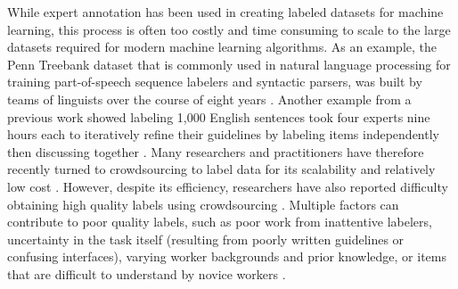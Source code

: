 While expert annotation has been used in creating labeled datasets for machine learning, this process is often too costly and time consuming to scale to the large datasets required for modern machine learning algorithms. As an example, the Penn Treebank dataset that is commonly used in natural language processing for training part-of-speech sequence labelers and syntactic parsers, was built by teams of linguists over the course of eight years \cite{taylor2003penn}. Another example from a previous work showed labeling 1,000 English sentences took four experts nine hours each to iteratively refine their guidelines by labeling items independently then discussing together \cite{wiebe1999development}. %
Many researchers and practitioners have therefore recently turned to crowdsourcing to label data for its scalability and relatively low cost \cite{deng2009imagenet,krizhevsky2012imagenet,post2012constructing}. However, despite its efficiency, researchers have also reported difficulty obtaining high quality labels using crowdsourcing \cite{alonso2013some,Demartini:2012:ZLP:2187836.2187900}. Multiple factors can contribute to poor quality labels, such as poor work from inattentive labelers, uncertainty in the task itself (resulting from poorly written guidelines or confusing interfaces), varying worker backgrounds and prior knowledge, or items that are difficult to understand by novice workers \cite{knowlton1966definition}. 

